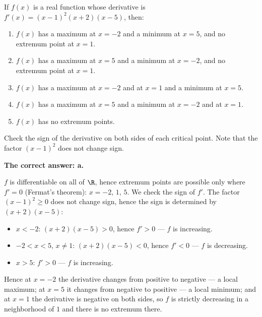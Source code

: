 
\begin{question}
If $f(x)$ is a real function whose derivative is $f'(x)=(x-1)^2(x+2)(x-5)$, then:
\begin{enumerate}
  \item $f(x)$ has a maximum at $x=-2$ and a minimum at $x=5$, and no extremum point at $x=1$.
  \item $f(x)$ has a maximum at $x=5$ and a minimum at $x=-2$, and no extremum point at $x=1$.
  \item $f(x)$ has a maximum at $x=-2$ and at $x=1$ and a minimum at $x=5$.
  \item $f(x)$ has a maximum at $x=5$ and a minimum at $x=-2$ and at $x=1$.
  \item $f(x)$ has no extremum points.
\end{enumerate}
\end{question}

\begin{hint}
Check the sign of the derivative on both sides of each critical point. Note that the factor $(x-1)^2$ does not change sign.
\end{hint}

\begin{solution}
\textbf{The correct answer: a.}

$f$ is differentiable on all of $\R$, hence extremum points are possible only where $f'=0$ (Fermat's theorem): $x=-2,\,1,\,5$. We check the sign of $f'$. The factor $(x-1)^2\ge0$ does not change sign, hence the sign is determined by $(x+2)(x-5)$:
\begin{itemize}
  \item $x<-2$: $(x+2)(x-5)>0$, hence $f'>0$ --- $f$ is increasing.
  \item $-2<x<5$, $x\neq 1$: $(x+2)(x-5)<0$, hence $f'<0$ --- $f$ is decreasing.
  \item $x>5$: $f'>0$ --- $f$ is increasing.
\end{itemize}
Hence at $x=-2$ the derivative changes from positive to negative --- a local maximum; at $x=5$ it changes from negative to positive --- a local minimum; and at $x=1$ the derivative is negative on both sides, so $f$ is strictly decreasing in a neighborhood of $1$ and there is no extremum there.
\end{solution}
